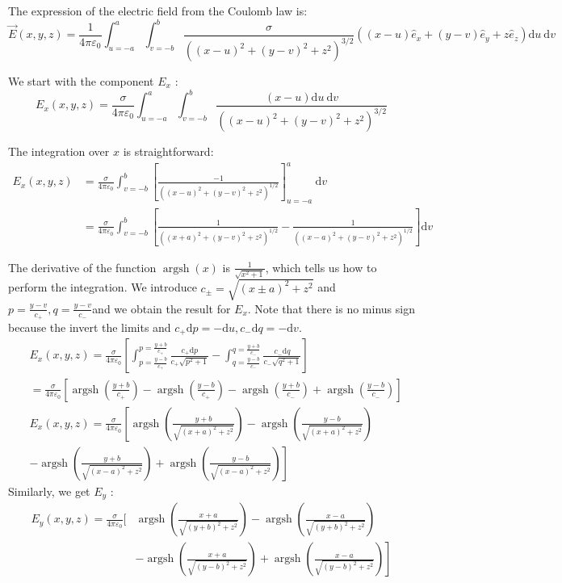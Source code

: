 \documentclass[12pt]{article}
\begin{document}
The expression of the electric field from the Coulomb law is:
\[
\vec{E}(x, y, z)=\frac{1}{4 \pi \varepsilon_0} \int_{u=-a}^a \int_{v=-b}^b \frac{\sigma}{\left((x-u)^2+(y-v)^2+z^2\right)^{3 / 2}}\left((x-u) \hat{e}_x+(y-v) \hat{e}_y+z \hat{e}_z\right) \mathrm{d} u \mathrm{~d} v
\]

We start with the component \(E_x\) :
\[
E_x(x, y, z)=\frac{\sigma}{4 \pi \varepsilon_0} \int_{u=-a}^a \int_{v=-b}^b \frac{(x-u) \mathrm{d} u \mathrm{~d} v}{\left((x-u)^2+(y-v)^2+z^2\right)^{3 / 2}}
\]

The integration over \(x\) is straightforward:
\[
\begin{aligned}
E_x(x, y, z) & =\frac{\sigma}{4 \pi \varepsilon_0} \int_{v=-b}^b\left[\frac{-1}{\left((x-u)^2+(y-v)^2+z^2\right)^{1 / 2}}\right]_{u=-a}^a \mathrm{~d} v \\
& =\frac{\sigma}{4 \pi \varepsilon_0} \int_{v=-b}^b\left[\frac{1}{\left((x+a)^2+(y-v)^2+z^2\right)^{1 / 2}}-\frac{1}{\left((x-a)^2+(y-v)^2+z^2\right)^{1 / 2}}\right] \mathrm{d} v
\end{aligned}
\]

The derivative of the function \(\operatorname{argsh}(x)\) is \(\frac{1}{\sqrt{x^2+1}}\), which tells us how to perform the integration. We introduce \(c_{ \pm}=\sqrt{(x \pm a)^2+z^2}\) and \(p=\frac{y-v}{c_{+}}, q=\frac{y-v}{c_{-}}\)and we obtain the result for \(E_x\). Note that there is no minus sign because the invert the limits and \(c_{+} \mathrm{d} p=-\mathrm{d} u, c_{-} \mathrm{d} q=-\mathrm{d} v\).
\[
\begin{aligned}
& E_x(x, y, z)=\frac{\sigma}{4 \pi \varepsilon_0}\left[\int_{p=\frac{y-b}{c_{+}}}^{p=\frac{y+b}{c_{+}}} \frac{c_{+} \mathrm{d} p}{c_{+} \sqrt{p^2+1}}-\int_{q=\frac{y-b}{c_{-}}}^{q=\frac{y+b}{c_{-}}} \frac{c_{-} \mathrm{d} q}{c_{-} \sqrt{q^2+1}}\right] \\
&=\frac{\sigma}{4 \pi \varepsilon_0}\left[\operatorname{argsh}\left(\frac{y+b}{c_{+}}\right)-\operatorname{argsh}\left(\frac{y-b}{c_{+}}\right)-\operatorname{argsh}\left(\frac{y+b}{c_{-}}\right)+\operatorname{argsh}\left(\frac{y-b}{c_{-}}\right)\right] \\
& E_x(x, y, z)=\frac{\sigma}{4 \pi \varepsilon_0} {\left[\operatorname{argsh}\left(\frac{y+b}{\sqrt{(x+a)^2+z^2}}\right)-\operatorname{argsh}\left(\frac{y-b}{\sqrt{(x+a)^2+z^2}}\right)\right.} \\
&\left.-\operatorname{argsh}\left(\frac{y+b}{\sqrt{(x-a)^2+z^2}}\right)+\operatorname{argsh}\left(\frac{y-b}{\sqrt{(x-a)^2+z^2}}\right)\right]
\end{aligned}
\]
Similarly, we get \(E_y\) :
\[
\begin{aligned}
E_y(x, y, z)=\frac{\sigma}{4 \pi \varepsilon_0}[ & \operatorname{argsh}\left(\frac{x+a}{\sqrt{(y+b)^2+z^2}}\right)-\operatorname{argsh}\left(\frac{x-a}{\sqrt{(y+b)^2+z^2}}\right) \\
& \left.-\operatorname{argsh}\left(\frac{x+a}{\sqrt{(y-b)^2+z^2}}\right)+\operatorname{argsh}\left(\frac{x-a}{\sqrt{(y-b)^2+z^2}}\right)\right]
\end{aligned}
\]
\end{document}
